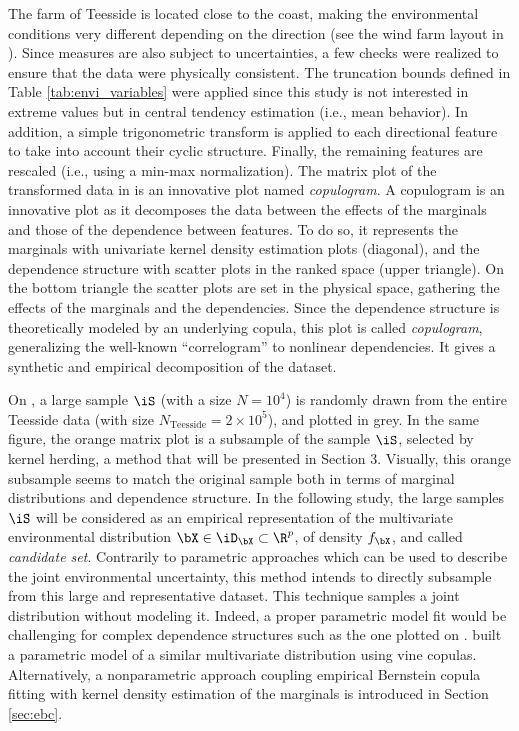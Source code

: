 The farm of Teesside is located close to the coast, making the environmental conditions very different depending on the direction (see the wind farm layout in ). 
Since measures are also subject to uncertainties, a few checks were realized to ensure that the data were physically consistent. 
The truncation bounds defined in Table \ref{tab:envi_variables} were applied since this study is not interested in extreme values but in central tendency estimation (i.e., mean behavior). 
In addition, a simple trigonometric transform is applied to each directional feature to take into account their cyclic structure. 
Finally, the remaining features are rescaled (i.e., using a min-max normalization). 
The matrix plot of the transformed data in  is an innovative plot named \emph{copulogram}. 
A copulogram is an innovative plot as it decomposes the data between the effects of the marginals and those of the dependence between features. 
To do so, it represents the marginals with univariate kernel density estimation plots (diagonal), and the dependence structure with scatter plots in the ranked space (upper triangle). 
On the bottom triangle the scatter plots are set in the physical space, gathering the effects of the marginals and the dependencies. 
Since the dependence structure is theoretically modeled by an underlying copula, this plot is called \emph{copulogram}, generalizing the well-known ``correlogram'' to nonlinear dependencies. 
It gives a synthetic and empirical decomposition of the dataset.

On , a large sample $\iS$ (with a size $N=10^4$) is randomly drawn from the entire Teesside data (with size $N_{\mathrm{Teesside}} = 2\times 10^5$), and plotted in grey. 
In the same figure, the orange matrix plot is a subsample of the sample $\iS$, selected by kernel herding, a method that will be presented in Section 3. 
Visually, this orange subsample seems to match the original sample both in terms of marginal distributions and dependence structure. 
In the following study, the large samples $\iS$ will be considered as an empirical representation of the multivariate environmental distribution $\bX \in \iD_{\bX} \subset \R^p$, of density $f_{\bX}$, and called \textit{candidate set}. 
Contrarily to parametric approaches which can be used to describe the joint environmental uncertainty, this method intends to directly subsample from this large and representative dataset. 
This technique samples a joint distribution without modeling it. Indeed, a proper parametric model fit would be challenging for complex dependence structures such as the one plotted on . 
\cite{li_zhan_2020} built a parametric model of a similar multivariate distribution using vine copulas. 
Alternatively, a nonparametric approach coupling empirical Bernstein copula fitting with kernel density estimation of the marginals is introduced in Section \ref{sec:ebc}.

